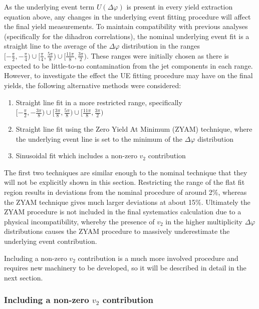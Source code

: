 As the underlying event term $U(\Delta\varphi)$ is present in every yield extraction equation above, any changes in the underlying event fitting procedure will affect the final yield measurements. To maintain compatibility with previous analyses (specifically for the dihadron correlations), the nominal underlying event fit is a straight line to the average of the $\Delta\varphi$ distribution in the ranges $[-\frac{\pi}{2}, -\frac{\pi}{4}) \cup [\frac{\pi}{4}, \frac{5\pi}{8}) \cup [\frac{11\pi}{8}, \frac{3\pi}{2})$. These ranges were initially chosen as there is expected to be little-to-no contamination from the jet components in each range. However, to investigate the effect the UE fitting procedure may have on the final yields, the following alternative methods were considered:
%
\begin{enumerate}
    \item Straight line fit in a more restricted range, specifically $[-\frac{\pi}{2}, -\frac{3\pi}{8}) \cup [\frac{3\pi}{8}, \frac{5\pi}{8}) \cup [\frac{11\pi}{8}, \frac{3\pi}{2})$
    \item Straight line fit using the Zero Yield At Minimum (ZYAM) technique, where the underlying event line is set to the minimum of the $\Delta\varphi$ distribution
    \item Sinusoidal fit which includes a non-zero $v_{2}$ contribution
\end{enumerate}
%
The first two techniques are similar enough to the nominal technique that they will not be explicitly shown in this section. Restricting the range of the flat fit region results in deviations from the nominal procedure of around 2\%, whereas the ZYAM technique gives much larger deviations at about 15\%. Ultimately the ZYAM procedure is not included in the final systematics calculation due to a physical incompatibility, whereby the presence of $v_{2}$ in the higher multiplicity $\Delta\varphi$ distributions causes the ZYAM procedure to massively underestimate the underlying event contribution.

Including a non-zero $v_{2}$ contribution is a much more involved procedure and requires new machinery to be developed, so it will be described in detail in the next section.

\subsubsection{Including a non-zero $v_{2}$ contribution}
\label{sec:ue_fit_v2}

